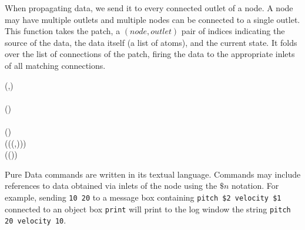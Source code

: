 When propagating data, we send it to every connected outlet of a node. A node
may have multiple outlets and multiple nodes can be connected to a single
outlet. This function takes the patch, a $\left(node, outlet\right)$ pair of
indices indicating the source of the data, the data itself (a list of atoms),
and the current state. It folds over the list of connections of the patch,
firing the data to the appropriate inlets of all matching connections.

\begin{hscode}\SaveRestoreHook
{}%
%
%
%
%
%
\>[B]{}\mathbin{::}\to (,)\to {}\to {}\<[E]%
\\
\>[B]{}\;\;\;\;\mathrel{=}{}\<[E]%
\\
\>[B]{}\<[4]%
\>[4]{}\;\;\;(\;){}\<[E]%
\\
\>[B]{}\<[4]%
\>[4]{}\<[E]%
\\
\>[4]{}\<[7]%
\>[7]{}\mathbin{::}\to (\cdot \rhd \cdot )\to {}\<[E]%
\\
\>[4]{}\<[7]%
\>[7]{}\;\;(\rhd ((,))){}\<[E]%
\\
\>[7]{}\<[10]%
\>[10]{}\mid {}\equiv {}\<[29]%
\>[29]{}\mathrel{=}\;\;(\;(\;)\;)\;\;\;\<[E]%
\\
\>[7]{}\<[10]%
\>[10]{}\mid {}\<[29]%
\>[29]{}\mathrel{=}\<[E]%
\ColumnHook
\end{hscode}\resethooks

Pure Data commands are written in its textual language. Commands may include
references to data obtained via inlets of the node using the $\$n$ notation.
For example, sending \texttt{10 20} to a message box containing \texttt{pitch
\$2 velocity \$1} connected to an object box \texttt{print} will print to the
log window the string \texttt{pitch 20 velocity 10}.

